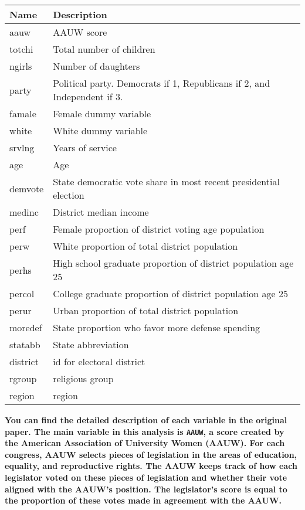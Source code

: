 \documentclass[
]{article}
\begin{document}
\begin{longtable}[]{@{}
  >{\raggedright\arraybackslash}p{}
  >{\raggedright\arraybackslash}p{}@{}}
\toprule
Name & Description \\
\midrule
\endhead
aauw & AAUW score \\
totchi & Total number of children \\
ngirls & Number of daughters \\
party & Political party. Democrats if 1, Republicans if 2, and
Independent if 3. \\
famale & Female dummy variable \\
white & White dummy variable \\
srvlng & Years of service \\
age & Age \\
demvote & State democratic vote share in most recent presidential
election \\
medinc & District median income \\
perf & Female proportion of district voting age population \\
perw & White proportion of total district population \\
perhs & High school graduate proportion of district population age 25 \\
percol & College graduate proportion of district population age 25 \\
perur & Urban proportion of total district population \\
moredef & State proportion who favor more defense spending \\
statabb & State abbreviation \\
district & id for electoral district \\
rgroup & religious group \\
region & region \\
\bottomrule
\end{longtable}

\textbf{You can find the detailed description of each variable in the
original paper. The main variable in this analysis is \texttt{AAUW}, a
score created by the American Association of University Women (AAUW).
For each congress, AAUW selects pieces of legislation in the areas of
education, equality, and reproductive rights. The AAUW keeps track of
how each legislator voted on these pieces of legislation and whether
their vote aligned with the AAUW's position. The legislator's score is
equal to the proportion of these votes made in agreement with the AAUW.}
\end{document}
